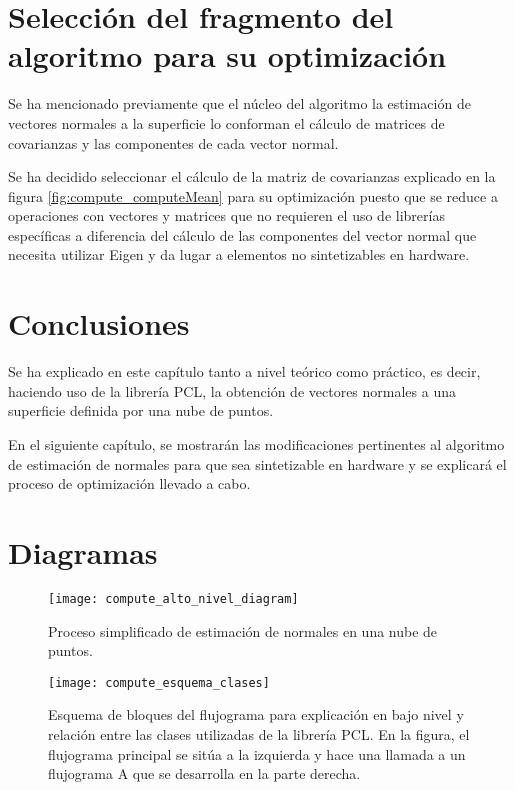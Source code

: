 
\section{Selección del fragmento del algoritmo para su optimización}
Se ha mencionado previamente que el núcleo del algoritmo la estimación de vectores normales a la superficie lo conforman el cálculo de matrices de covarianzas y las componentes de cada vector normal.

Se ha decidido seleccionar el cálculo de la matriz de covarianzas explicado en la figura \ref{fig:compute_computeMean} para su optimización puesto que se reduce a operaciones con vectores y matrices que no requieren el uso de librerías específicas a diferencia del cálculo de las componentes del vector normal que necesita utilizar Eigen y da lugar a elementos no sintetizables en hardware. 

\section{Conclusiones}

Se ha explicado en este capítulo tanto a nivel teórico como práctico, es decir, haciendo uso de la librería PCL, la obtención de vectores normales a una superficie definida por una nube de puntos.

En el siguiente capítulo, se mostrarán las modificaciones pertinentes al algoritmo de estimación de normales para que sea sintetizable en hardware y se explicará el proceso de optimización llevado a cabo.

\section{Diagramas}

\begin{figure}[!htb]
\centering
{}
  \texttt{[image: compute\_alto\_nivel\_diagram]}
  \caption{Proceso simplificado de estimación de normales en una nube de puntos.}\label{fig:compute_alto_nivel_diagram}
\endminipage\hfill
\end{figure}


\begin{figure}[h!]
\centering
\texttt{[image: compute\_esquema\_clases]}
\caption{Esquema de bloques del flujograma para explicación en bajo nivel y relación entre las clases utilizadas de la librería PCL. En la figura, el flujograma principal se sitúa a la izquierda y hace una llamada a un flujograma A que se desarrolla en la parte derecha.}\label{fig:compute_esquema_clases}
\end{figure}

